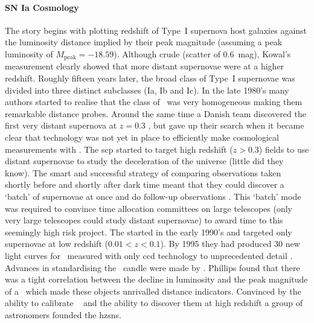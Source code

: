 \paragraph{SN Ia Cosmology}
The story begins with \citet{1968AJ.....73.1021K} plotting redshift of Type~I supernova host galaxies against the luminosity distance implied by their peak magnitude (assuming a peak luminosity of $M_\textrm{peak}=-18.59$). Although crude (scatter of 0.6~mag), Kowal's measurement clearly showed that more distant supernovae were at a higher redshift. Roughly fifteen years later, the broad class of Type~I supernovae was divided into three distinct subclasses (Ia, Ib and Ic). In the late 1980's many authors started to realise that the class of \sneia\ was very homogeneous \citep[][and references therein]{1992ARA&A..30..359B} making them remarkable distance probes. Around the same time a Danish team discovered the first very distant supernova at $z=0.3$ \citep{1989Natur.339..523N}, but gave up their search when it became clear that technology was not yet in place to efficiently make cosmological measurements with \snia. The \gls{scp} started to target high redshift ($z>0.3$) fields to use distant supernovae to study the deceleration of the universe (little did they know). The smart and successful strategy of comparing observations taken shortly before and shortly after dark time meant that they could discover a `batch' of supernovae at once and do follow-up observations \citep{1995STIN...9629501P}. This `batch' mode was required to convince time allocation committees on large telescopes (only very large telescopes could study distant supernovae) to award time to this seemingly high risk project. The  started in the early 1990's and targeted only supernovae at low redshift ($0.01 < z < 0.1$). By 1995 they had produced 30 new light curves for \sneia\ measured with only \gls{ccd} technology to unprecedented detail \citep{1995AJ....109....1H}. Advances in standardising the \snia\ candle were made by \citet{1993ApJ...413L.105P}. Phillips found that there was a tight correlation between the decline in luminosity and the peak magnitude of a \snia\ which made these objects unrivalled distance indicators. Convinced by the ability to calibrate \sneia\ \citep{1993ApJ...413L.105P} and the ability to discover them at high redshift  \citep{1995STIN...9629501P} a group of astronomers founded the \gls{hzsns}. 
